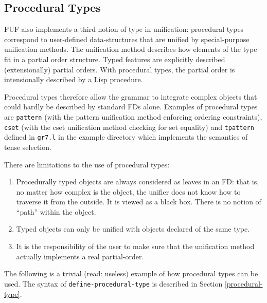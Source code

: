 \documentclass[10pt,a4paper]{report}
\begin{document}
\subsection{Procedural Types}

FUF also implements a third notion of type in unification: procedural types
correspond to user-defined data-structures that are unified by
special-purpose unification methods.  The unification method describes how
elements of the type fit in a partial order structure.  Typed features are
explicitly described (extensionally) partial orders.  With procedural
types, the partial order is intensionally described by a Lisp procedure.  

Procedural types therefore allow the grammar to integrate complex objects
that could hardly be described by standard FDs alone.  Examples of
procedural types are {\tt pattern} (with the pattern unification method
enforcing ordering constraints), {\tt cset} (with the cset unification method
checking for set equality) and {\tt tpattern} defined in {\tt gr7.l} in the
example directory which implements the semantics of tense selection.


There are limitations to the use of procedural types:
\begin{enumerate}
\item Procedurally typed objects are always considered as leaves in an FD: that
is, no matter how complex is the object, the unifier does not know how to
traverse it from the outside.  It is viewed as a black box.  There is no
notion of ``path'' within the object.

\item Typed objects can only be unified with objects declared of the same type.

\item It is the responsibility of the user to make sure that the unification
method actually implements a real partial-order.  
\end{enumerate}

The following is a trivial (read: useless) example of how procedural types
can be used.  The syntax of {\tt define-procedural-type} is described in
Section \ref{procedural-type}.
\end{document}
